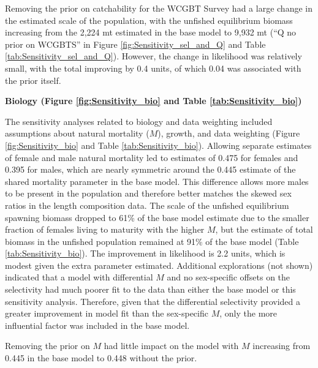 \documentclass[12pt,]{article}
\begin{document}
Removing the prior on catchability for the WCGBT Survey had a large
change in the estimated scale of the population, with the unfished
equilibrium biomass increasing from the 2,224 mt estimated in the base
model to 9,932 mt (``Q no prior on WCGBTS'' in Figure
\ref{fig:Sensitivity_sel_and_Q} and Table
\ref{tab:Sensitivity_sel_and_Q}). However, the change in likelihood was
relatively small, with the total improving by 0.4 units, of which 0.04
was associated with the prior itself.

\textbf{Biology (Figure \ref{fig:Sensitivity_bio} and Table
\ref{tab:Sensitivity_bio})}

The sensitivity analyses related to biology and data weighting included
assumptions about natural mortality (\(M\)), growth, and data weighting
(Figure \ref{fig:Sensitivity_bio} and Table \ref{tab:Sensitivity_bio}).
Allowing separate estimates of female and male natural mortality led to
estimates of 0.475 for females and 0.395 for males, which are nearly
symmetric around the 0.445 estimate of the shared mortality parameter in
the base model. This difference allows more males to be present in the
population and therefore better matches the skewed sex ratios in the
length composition data. The scale of the unfished equilibrium spawning
biomass dropped to 61\% of the base model estimate due to the smaller
fraction of females living to maturity with the higher \(M\), but the
estimate of total biomass in the unfished population remained at 91\% of
the base model (Table \ref{tab:Sensitivity_bio}). The improvement in
likelihood is 2.2 units, which is modest given the extra parameter
estimated. Additional explorations (not shown) indicated that a model
with differential \(M\) and no sex-specific offsets on the selectivity
had much poorer fit to the data than either the base model or this
sensitivity analysis. Therefore, given that the differential selectivity
provided a greater improvement in model fit than the sex-specific \(M\),
only the more influential factor was included in the base model.

Removing the prior on \(M\) had little impact on the model with \(M\)
increasing from 0.445 in the base model to 0.448 without the prior.
\end{document}
